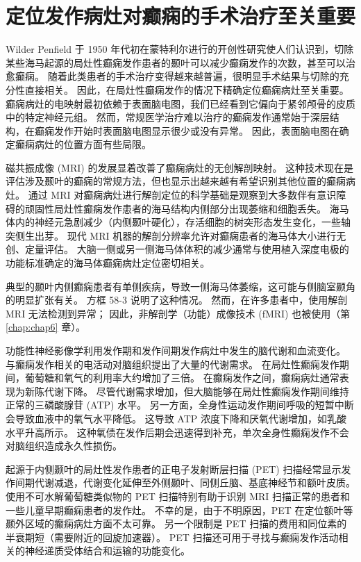 \section{定位发作病灶对癫痫的手术治疗至关重要}
Wilder Penfield 于 1950 年代初在蒙特利尔进行的开创性研究使人们认识到，切除某些海马起源的局灶性癫痫发作患者的颞叶可以减少癫痫发作的次数，甚至可以治愈癫痫。 随着此类患者的手术治疗变得越来越普遍，很明显手术结果与切除的充分性直接相关。 因此，在局灶性癫痫发作的情况下精确定位癫痫病灶至关重要。 癫痫病灶的电映射最初依赖于表面脑电图，我们已经看到它偏向于紧邻颅骨的皮质中的特定神经元组。 然而，常规医学治疗难以治疗的癫痫发作通常始于深层结构，在癫痫发作开始时表面脑电图显示很少或没有异常。 因此，表面脑电图在确定癫痫病灶的位置方面有些局限。

磁共振成像 (MRI) 的发展显着改善了癫痫病灶的无创解剖映射。 这种技术现在是评估涉及颞叶的癫痫的常规方法，但也显示出越来越有希望识别其他位置的癫痫病灶。 通过 MRI 对癫痫病灶进行解剖定位的科学基础是观察到大多数伴有意识障碍的顽固性局灶性癫痫发作患者的海马结构内侧部分出现萎缩和细胞丢失。 海马体内的神经元急剧减少（内侧颞叶硬化），存活细胞的树突形态发生变化，一些轴突侧生出芽。 现代 MRI 机器的解剖分辨率允许对癫痫患者的海马体大小进行无创、定量评估。 大脑一侧或另一侧海马体体积的减少通常与使用植入深度电极的功能标准确定的海马体癫痫病灶定位密切相关。

典型的颞叶内侧癫痫患者有单侧疾病，导致一侧海马体萎缩，这可能与侧脑室颞角的明显扩张有关。 方框 58-3 说明了这种情况。 然而，在许多患者中，使用解剖 MRI 无法检测到异常； 因此，非解剖学（功能）成像技术 (fMRI) 也被使用（第 \ref{chap:chap6} 章）。

功能性神经影像学利用发作期和发作间期发作病灶中发生的脑代谢和血流变化。 与癫痫发作相关的电活动对脑组织提出了大量的代谢需求。 在局灶性癫痫发作期间，葡萄糖和氧气的利用率大约增加了三倍。 在癫痫发作之间，癫痫病灶通常表现为新陈代谢下降。 尽管代谢需求增加，但大脑能够在局灶性癫痫发作期间维持正常的三磷酸腺苷 (ATP) 水平。 另一方面，全身性运动发作期间呼吸的短暂中断会导致血液中的氧气水平降低。 这导致 ATP 浓度下降和厌氧代谢增加，如乳酸水平升高所示。 这种氧债在发作后期会迅速得到补充，单次全身性癫痫发作不会对脑组织造成永久性损伤。

起源于内侧颞叶的局灶性发作患者的正电子发射断层扫描 (PET) 扫描经常显示发作间期代谢减退，代谢变化延伸至外侧颞叶、同侧丘脑、基底神经节和额叶皮质。 使用不可水解葡萄糖类似物的 PET 扫描特别有助于识别 MRI 扫描正常的患者和一些儿童早期癫痫患者的发作灶。 不幸的是，由于不明原因，PET 在定位额叶等颞外区域的癫痫病灶方面不太可靠。 另一个限制是 PET 扫描的费用和同位素的半衰期短（需要附近的回旋加速器）。 PET 扫描还可用于寻找与癫痫发作活动相关的神经递质受体结合和运输的功能变化。

